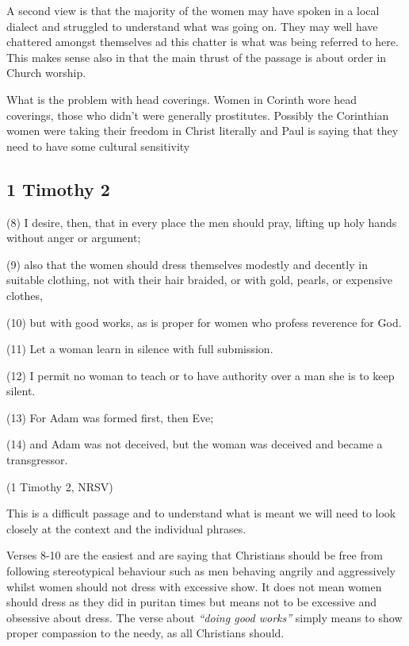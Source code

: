\documentclass[a5paper, openany, oneside, pagesize,
headings=standardclasses, chapterprefix=false]{scrbook}
\begin{document}
A second view is that the majority of the women may have spoken in a
local dialect and struggled to understand what was going on. They may
well have chattered amongst themselves ad this chatter is what was
being referred to here. This makes sense also in that the main thrust
of the passage is about order in Church worship.

What is the problem with head coverings. Women in Corinth wore head
coverings, those who didn't were generally prostitutes. Possibly the
Corinthian women were taking their freedom in Christ literally and Paul
is saying that they need to have some cultural sensitivity  


\subsection{1 Timothy 2}

\begin{myquote}
(8) I desire, then, that in every place the men should pray, lifting
up holy hands without anger or argument;

(9) also that the women should dress themselves modestly and decently
in suitable clothing, not with their hair braided, or with gold,
pearls, or expensive clothes,

(10) but with good works, as is proper for women who profess reverence
for God.

(11) Let a woman learn in silence with full submission.

(12) I permit no woman to teach or to have authority over a man she
is to keep silent.

(13) For Adam was formed first, then Eve;

(14) and Adam was not deceived, but the woman was deceived and became
a transgressor.

(1 Timothy 2, NRSV)
\end{myquote}

This is a difficult passage and to understand what is meant we will
need to look closely at the context and the individual phrases. 

Verses 8-10 are the easiest and are saying that Christians should be
free from following stereotypical behaviour such as men behaving
angrily and aggressively whilst women should not dress with excessive
show. It does not mean women should dress as they did in puritan times
but means not to be excessive and obsessive about dress. The verse
about \emph{``doing good works''} simply means to show proper
compassion to the needy, as all Christians should.  
\end{document}
